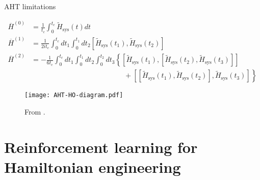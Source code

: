 \documentclass{beamer}
\begin{document}
\begin{frame}{AHT limitations}

{\scriptsize %
\begin{align*}
    \overline{H}^{(0)} &= \frac{1}{t_c} \int_0^{t_c}
        \widetilde{H}_{\text{sys}}(t) dt \\
    \overline{H}^{(1)} &= \frac{1}{2it_c} \int_0^{t_c} dt_1 \int_0^{t_1} dt_2
        \left[\widetilde{H}_{\text{sys}}(t_1), \widetilde{H}_{\text{sys}}(t_2)\right] \\
    \overline{H}^{(2)} &= -\frac{1}{6t_c}
    \int_0^{t_c} dt_1 \int_0^{t_1} dt_2 \int_0^{t_2} dt_3
    \left\{
    \left[\widetilde{H}_{\text{sys}}(t_1), \left[\widetilde{H}_{\text{sys}}(t_2), \widetilde{H}_{\text{sys}}(t_3)\right]\right] \right. \\
    & \hspace{13em} + \left.
    \left[\left[\widetilde{H}_{\text{sys}}(t_1), \widetilde{H}_{\text{sys}}(t_2)\right], \widetilde{H}_{\text{sys}}(t_3)\right]
    \right\}
\end{align*}
}
\vspace{-1em}
\begin{figure}
\centering
\texttt{[image: AHT-HO-diagram.pdf]}

{\scriptsize From \cite{brinkmann_2016}.}
\end{figure}


\end{frame}



\section{Reinforcement learning for Hamiltonian engineering}
\end{document}
